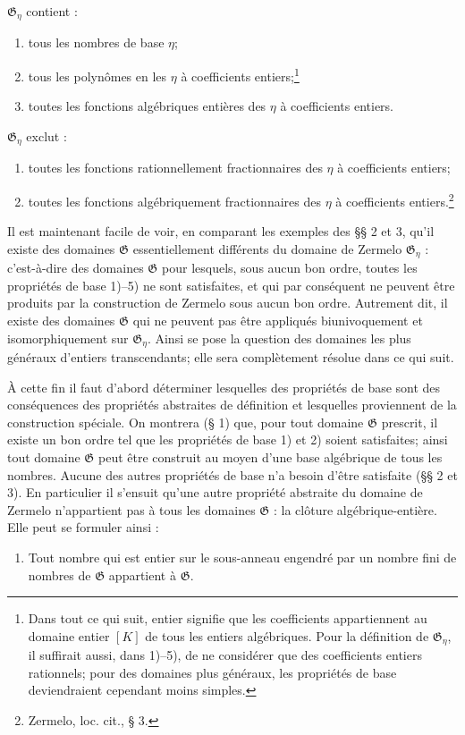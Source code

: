$\mathfrak G_\eta$ contient :
\begin{enumerate}
\item[1)] tous les nombres de base $\eta$;
\item[2)] tous les polynômes en les $\eta$ à coefficients entiers;\footnote{Dans tout ce qui suit, \og{} entier \fg{} signifie que les coefficients appartiennent au domaine entier $[K]$ de tous les entiers algébriques. Pour la définition de $\mathfrak G_\eta$, il suffirait aussi, dans 1)--5), de ne considérer que des coefficients entiers rationnels; pour des domaines plus généraux, les propriétés de base deviendraient cependant moins simples.}
\item[3)] toutes les fonctions algébriques entières des $\eta$ à coefficients entiers.
\end{enumerate}
$\mathfrak G_\eta$ exclut :
\begin{enumerate}
\item[4)] toutes les fonctions rationnellement fractionnaires des $\eta$ à coefficients entiers;
\item[5)] toutes les fonctions algébriquement fractionnaires des $\eta$ à coefficients entiers.\footnote{Zermelo, loc. cit., \S{} 3.}
\end{enumerate}

Il est maintenant facile de voir, en comparant les exemples des \S{}\S{} 2 et 3, qu'il existe des domaines $\mathfrak G$ essentiellement différents du domaine de Zermelo $\mathfrak G_\eta$ : c'est-à-dire des domaines $\mathfrak G$ pour lesquels, sous aucun bon ordre, toutes les propriétés de base 1)--5) ne sont satisfaites, et qui par conséquent ne peuvent être produits par la construction de Zermelo sous aucun bon ordre. Autrement dit, il existe des domaines $\mathfrak G$ qui ne peuvent pas être appliqués biunivoquement et isomorphiquement sur $\mathfrak G_\eta$. Ainsi se pose la question des domaines les plus généraux d'entiers transcendants; elle sera complètement résolue dans ce qui suit.

À cette fin il faut d'abord déterminer lesquelles des propriétés de base sont des conséquences des propriétés abstraites de définition et lesquelles proviennent de la construction spéciale. On montrera (\S{} 1) que, pour tout domaine $\mathfrak G$ prescrit, il existe un bon ordre tel que les propriétés de base 1) et 2) soient satisfaites; ainsi tout domaine $\mathfrak G$ peut être construit au moyen d'une base algébrique de tous les nombres. Aucune des autres propriétés de base n'a besoin d'être satisfaite (\S{}\S{} 2 et 3). En particulier il s'ensuit qu'une autre propriété abstraite du domaine de Zermelo n'appartient pas à tous les domaines $\mathfrak G$ : la clôture algébrique-entière. Elle peut se formuler ainsi :
\begin{enumerate}
\item[V.] Tout nombre qui est entier sur le sous-anneau engendré par un nombre fini de nombres de $\mathfrak G$ appartient à $\mathfrak G$.
\end{enumerate}

